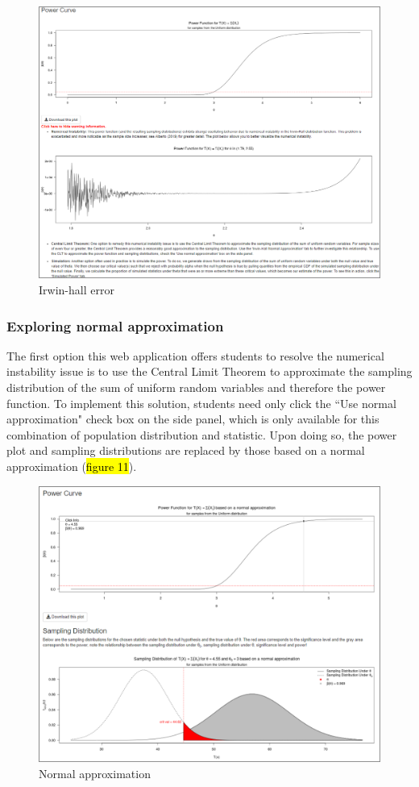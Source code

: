\documentclass{TISE}
\begin{document}
\begin{figure}[H]
	\centering
	\includegraphics[width=\textwidth]{irwinerror.png}
	\caption{Irwin-hall error}
\end{figure}

\subsubsection{Exploring normal approximation}

The first option this web application offers students to resolve the numerical instability issue is to use the Central Limit Theorem to approximate the sampling distribution of the sum of uniform random variables and therefore the power function. To implement this solution, students need only click the ``Use normal approximation" check box on the side panel, which is only available for this combination of population distribution and statistic. Upon doing so, the power plot and sampling distributions are replaced by those based on a normal approximation (\hl{figure 11}).

\begin{figure}[H]
	\centering
	\includegraphics[width=\textwidth]{normapprox1.png}
	\caption{Normal approximation}
\end{figure}
\end{document}
